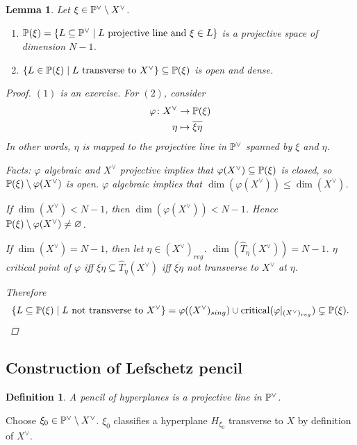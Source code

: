 \documentclass[A4paper, british]{amsart}
\theoremstyle{darkgreentheorem}
\newtheorem{lm}[thm]{Lemma}
\theoremstyle{darkbluedefinition}
\newtheorem{defn}[thm]{Definition}
\theoremstyle{darkredexample}
\theoremstyle{remark}
\newcommand{\1}{\mathbbm{1}}
\newcommand{\dual}{^{\vee}}
\newcommand{\sub}{\subseteq}
\begin{document}
\begin{lm}
    Let $\xi\in \P\dual\setminus X\dual$.
    \begin{enumerate}
	\item $\P(\xi)=\{L\sub \P\dual \mid L \text{ projective line and }\xi\in L\}$ is a projective space of dimension $N-1$.
	\item $\{L\in \P(\xi)\mid L \text{ transverse to }X\dual \}\sub \P(\xi)$ is open and dense.
    \end{enumerate}
    \begin{proof}
	$(1)$ is an exercise.
	For $(2)$, consider 
	\begin{align*}
	    \varphi\colon X\dual &\to \P(\xi) \\
	    \eta &\mapsto \overline{\xi\eta}
	\end{align*}
	In other words, $\eta$ is mapped to the projective line in $\P\dual$ spanned by $\xi $ and $\eta$.

	Facts:
	$\varphi$ algebraic and $X\dual$ projective implies that $\varphi(X\dual)\sub \P(\xi)$ is closed, so $\P(\xi)\setminus \varphi(X\dual)$ is open.
	$\varphi$ algebraic implies that $\dim(\varphi(X\dual))\leqslant \dim(X\dual)$.

	If $\dim(X\dual)<N-1$, then $\dim(\varphi(X\dual))<N-1$.
	Hence $\P(\xi)\setminus \varphi(X\dual)\neq \varnothing$.
	
	If $\dim(X\dual)=N-1$, then let $\eta\in (X\dual)_{reg}$.
	$\dim(\hat{T}_{\eta}(X\dual))=N-1$.
	$\eta$ critical point of $\varphi $ iff $\overline{\xi\eta}\sub \hat{T}_{\eta}(X\dual)$ iff $\overline{\xi\eta}$ not transverse to $X\dual$ at $\eta$.

	Therefore
	\[ \{L\sub \P(\xi)\mid L \text{ not transverse to }X\dual\}=\varphi((X\dual)_{sing})\cup \operatorname{critical}(\varphi|_{(X\dual)_{reg}})\subsetneq \P(\xi). \]
    \end{proof}
\end{lm}

\subsection{Construction of Lefschetz pencil}

\begin{defn}
    A \textit{pencil of hyperplanes} is a projective line in $\P\dual$.
\end{defn}

Choose $\xi_{0}\in \P\dual\setminus X\dual$.
$\xi_{0}$ classifies a hyperplane $H_{\xi_{0}}$ transverse to $X$ by definition of $X\dual$.
\end{document}
